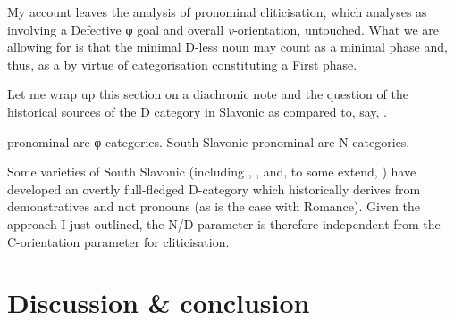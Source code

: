 \documentclass[output=paper]{langsci/langscibook}
\begin{document}
My account leaves the analysis of  pronominal
cliticisation, which \textcite{Roberts2010} analyses as involving a
Defective φ goal and overall \emph{v}-orientation, untouched. What we are
allowing for is that the minimal D-less noun may count as a minimal
phase and, thus, as a  by virtue of
categorisation constituting a First phase.

Let me wrap up this section on a diachronic note and the question of the
historical sources of the D category in Slavonic as compared to, say,
.

\begin{exe}
	\ex
	\begin{xlista}
	\ex {} pronominal  are φ-categories.
	\ex South Slavonic pronominal  are N-categories.
	\end{xlista}
\end{exe}

Some varieties of South Slavonic (including , ,
and, to some extend, ) have developed an overtly full-fledged
D-category which historically derives from demonstratives and not pronouns (as
is the case with Romance). Given the approach I just outlined, the N/D
parameter is therefore independent from the C-orientation parameter for
cliticisation.

%
%
%
%

\section{Discussion \& conclusion}
\end{document}
